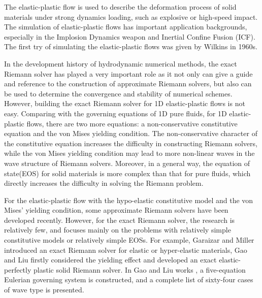 \documentclass[review]{elsarticle}
\numberwithin{equation}{section}
\numberwithin{table}{section}
\begin{document}
The  elastic-plastic flow  is  used to describe the deformation process of solid materials under strong dynamics loading, such as explosive or high-speed impact. The simulation of elastic-plastic flows has important application backgrounds, especially in the Implosion Dynamics weapon and Inertial Confine Fusion (ICF). The first try of simulating the elastic-plastic flows was given by  Wilkins \cite{wilkins1963calculation} in 1960s.

In the development history of hydrodynamic numerical methods, the exact Riemann solver has played a very important role as it not only can give a guide and reference to the construction of approximate Riemann solvers, but also can be used to determine the convergence and stability of numerical schemes. However, building the exact Riemann solver for 1D elastic-plastic flows is not easy. Comparing with the governing equations of 1D pure fluids, for 1D elastic-plastic flows, there are two more equations: a non-conservative constitutive equation and the von Mises yielding condition.  The non-conservative character of the constitutive equation increases the difficulty in constructing  Riemann solvers, while the von Mises yielding condition may lead to more non-linear waves in the wave structure of Riemann solvers. Moreover, in a general way, the equation of state(EOS) for solid materials is more complex than that for pure fluids, which directly increases the difficulty in solving the Riemann problem.

For the elastic-plastic flow with the hypo-elastic constitutive model and  the von Mises' yielding condition,  some approximate Riemann solvers\cite{gavrilyuk2008modelling,cheng2015high,cheng2016harten,liumulti} have been developed recently. However, for the exact Riemann solver, the research is relatively few, and focuses mainly on the problems with relatively simple constitutive models or  relatively simple EOSs.
For example, Garaizar \cite{garaizar1991solution} and Miller \cite{miller2004iterative} introduced  an exact Riemann solver for elastic or hyper-elastic materials, Gao and Liu \cite{gao20171d,gao2018complete} firstly considered the yielding effect and developed an exact elastic-perfectly plastic solid Riemann solver.  In Gao and Liu works  \cite{gao20171d,gao2018complete}, a five-equation Eulerian governing system is constructed, and a complete list of sixty-four cases of wave type is presented.
\end{document}
